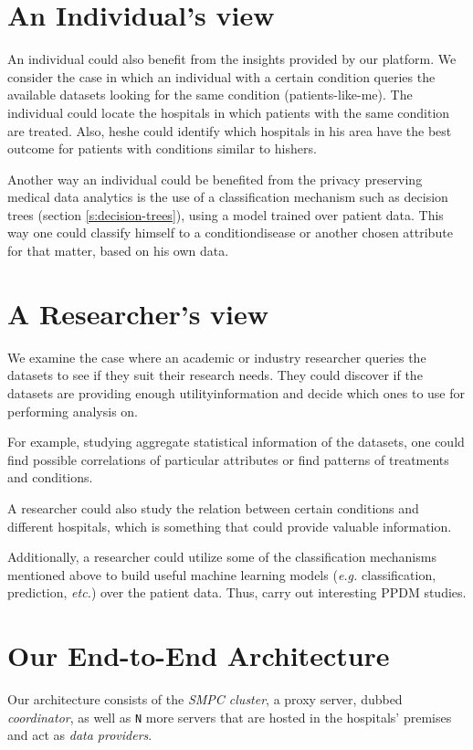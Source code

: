 \section{An Individual's view}
An individual could also benefit from the insights provided by our platform.
We consider the case in which an individual with a certain condition queries the available datasets looking for the same condition (patients\hyp like\hyp me).
The individual could locate the hospitals in which patients with the same condition are treated.
Also, he\myslash she could identify which hospitals in his area have the best outcome for patients with conditions similar to his\myslash hers.

Another way an individual could be benefited from the privacy preserving medical data analytics is the use of a classification mechanism such as decision trees (section \ref{s:decision-trees}), using a model trained over patient data.
This way one could classify himself to a condition\myslash disease or another chosen attribute for that matter, based on his own data.


\section{A Researcher's view}
We examine the case where an academic or industry researcher queries the datasets to see if they suit their research needs.
They could discover if the datasets are providing enough utility\myslash information and decide which ones to use for performing analysis on.

For example, studying aggregate statistical information of the datasets, one could find possible correlations of particular attributes or find patterns of treatments and conditions.

A researcher could also study the relation between certain conditions and different hospitals, which is something that could provide valuable information.

Additionally, a researcher could utilize some of the classification mechanisms mentioned above to build useful machine learning models (\textit{e.g.} classification, prediction, \textit{etc.}) over the patient data.
Thus, carry out interesting PPDM studies.



\section{Our End-to-End Architecture}\label{s:architecture}
Our architecture consists of the \textit{SMPC cluster}, a proxy server, dubbed \textit{coordinator}, as well as \texttt{N} more servers that are hosted in the hospitals' premises and act as \textit{data providers}.

